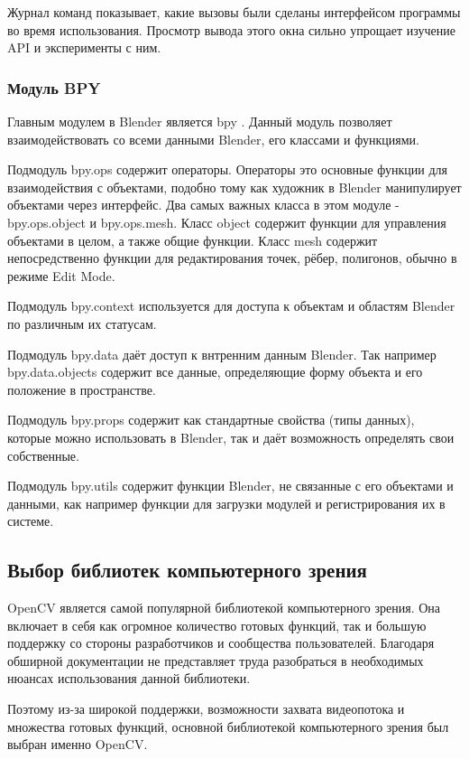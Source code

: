 Журнал команд показывает, какие вызовы были сделаны интерфейсом программы во время использования. Просмотр вывода этого окна сильно упрощает изучение API и эксперименты с ним.

\subsubsection{Модуль BPY}

Главным модулем в Blender является bpy \cite{blenderapiref}. Данный модуль позволяет взаимодействовать со всеми данными Blender, его классами и функциями. 

Подмодуль bpy.ops содержит операторы. Операторы это основные функции для взаимодействия с объектами, подобно тому как художник в Blender манипулирует объектами через интерфейс.
Два самых важных класса в этом модуле -  bpy.ops.object и bpy.ops.mesh. Класс object содержит функции для управления объектами в целом, а также общие функции. Класс mesh содержит непосредственно функции для редактирования точек, рёбер, полигонов, обычно в режиме Edit Mode.

Подмодуль bpy.context используется для доступа к объектам и областям Blender по различным их статусам.

Подмодуль bpy.data даёт доступ к внтренним данным Blender. Так например  bpy.data.objects содержит все данные, определяющие форму объекта и его положение в пространстве.

Подмодуль bpy.props содержит как стандартные свойства (типы данных), которые можно использовать в Blender, так и даёт возможность определять свои собственные.

Подмодуль bpy.utils содержит функции Blender, не связанные с его объектами и данными, как например функции для загрузки модулей и регистрирования их в системе.

\subsection{Выбор библиотек компьютерного зрения}
OpenCV \cite{ocvsite} является самой популярной библиотекой компьютерного зрения. Она включает в себя как огромное количество готовых функций, так и большую поддержку со стороны разработчиков и сообщества пользователей. Благодаря обширной документации не представляет труда разобраться в необходимых нюансах использования данной библиотеки.

Поэтому из-за широкой поддержки, возможности захвата видеопотока и множества готовых функций, основной библиотекой компьютерного зрения был выбран именно OpenCV.

